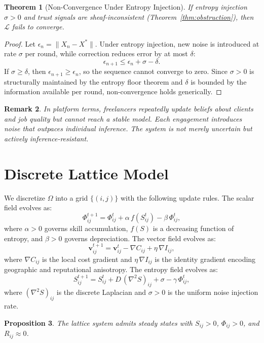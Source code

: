 \documentclass[11pt]{article}
\newtheorem{theorem}{Theorem}
\newtheorem{proposition}[theorem]{Proposition}
\newtheorem{remark}[theorem]{Remark}
\begin{document}
\begin{theorem}[Non-Convergence Under Entropy Injection]
If entropy injection $\sigma > 0$ and trust signals are sheaf-inconsistent
(Theorem~\ref{thm:obstruction}), then $\mathcal{L}$ fails to converge.
\end{theorem}

\begin{proof}
Let $\epsilon_n = \|X_n - X^*\|$. Under entropy injection, new noise is
introduced at rate $\sigma$ per round, while correction reduces error by at
most $\delta$:
\[
\epsilon_{n+1} \leq \epsilon_n + \sigma - \delta.
\]
If $\sigma \geq \delta$, then $\epsilon_{n+1} \geq \epsilon_n$, so the
sequence cannot converge to zero. Since $\sigma > 0$ is structurally
maintained by the entropy floor theorem and $\delta$ is bounded by the
information available per round, non-convergence holds generically.
\end{proof}

\begin{remark}
In platform terms, freelancers repeatedly update beliefs about clients and
job quality but cannot reach a stable model. Each engagement introduces noise
that outpaces individual inference. The system is not merely uncertain but
actively inference-resistant.
\end{remark}

\section{Discrete Lattice Model}
\label{sec:lattice}

We discretize $\Omega$ into a grid $\{(i,j)\}$ with the following update
rules. The scalar field evolves as:
\[
\Phi_{ij}^{t+1} = \Phi_{ij}^t + \alpha\,f(S_{ij}^t) - \beta\,\Phi_{ij}^t,
\]
where $\alpha > 0$ governs skill accumulation, $f(S)$ is a decreasing
function of entropy, and $\beta > 0$ governs depreciation. The vector field
evolves as:
\[
\mathbf{v}_{ij}^{t+1} = \mathbf{v}_{ij}^t - \nabla C_{ij} +
\eta\,\nabla I_{ij},
\]
where $\nabla C_{ij}$ is the local cost gradient and $\eta\,\nabla I_{ij}$
is the identity gradient encoding geographic and reputational anisotropy.
The entropy field evolves as:
\[
S_{ij}^{t+1} = S_{ij}^t + D\,(\nabla^2 S)_{ij} + \sigma -
\gamma\,\Phi_{ij}^t,
\]
where $(\nabla^2 S)_{ij}$ is the discrete Laplacian and $\sigma > 0$ is the
uniform noise injection rate.

\begin{proposition}
The lattice system admits steady states with $S_{ij} > 0$, $\Phi_{ij} > 0$,
and $R_{ij} \approx 0$.
\end{proposition}
\end{document}

